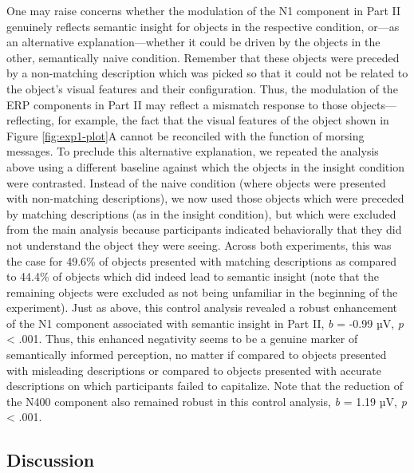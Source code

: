 \documentclass[
  english,
  man,11pt,floatsintext]{apa7}
\begin{document}
One may raise concerns whether the modulation of the N1 component in Part II genuinely reflects semantic insight for objects in the respective condition, or---as an alternative explanation---whether it could be driven by the objects in the other, semantically naive condition. Remember that these objects were preceded by a non-matching description which was picked so that it could not be related to the object's visual features and their configuration. Thus, the modulation of the ERP components in Part II may reflect a mismatch response to those objects---reflecting, for example, the fact that the visual features of the object shown in Figure \ref{fig:exp1-plot}A cannot be reconciled with the function of morsing messages. To preclude this alternative explanation, we repeated the analysis above using a different baseline against which the objects in the insight condition were contrasted. Instead of the naive condition (where objects were presented with non-matching descriptions), we now used those objects which were preceded by matching descriptions (as in the insight condition), but which were excluded from the main analysis because participants indicated behaviorally that they did not understand the object they were seeing. Across both experiments, this was the case for 49.6\% of objects presented with matching descriptions as compared to 44.4\% of objects which did indeed lead to semantic insight (note that the remaining objects were excluded as not being unfamiliar in the beginning of the experiment). Just as above, this control analysis revealed a robust enhancement of the N1 component associated with semantic insight in Part II, \emph{b} = -0.99 µV, \emph{p} \textless{} .001. Thus, this enhanced negativity seems to be a genuine marker of semantically informed perception, no matter if compared to objects presented with misleading descriptions or compared to objects presented with accurate descriptions on which participants failed to capitalize. Note that the reduction of the N400 component also remained robust in this control analysis, \emph{b} = 1.19 µV, \emph{p} \textless{} .001.

\hypertarget{discussion-1}{%
\subsection{Discussion}\label{discussion-1}}
\end{document}

